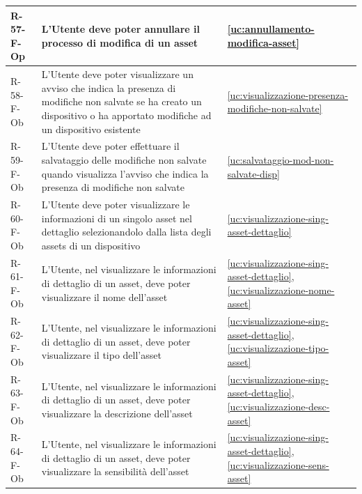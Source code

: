 ﻿\documentclass[a4paper,12pt]{article}
\begin{document}
{{\begin{longtable}{|l|p{}|p{}|}
            R-57-F-Op       & L'Utente deve poter annullare il processo di modifica di un asset                                                                                                                           & \ref{uc:annullamento-modifica-asset}                                               \\ \hline
            R-58-F-Ob       & L'Utente deve poter visualizzare un avviso che indica la presenza di modifiche non salvate se ha creato un dispositivo o ha apportato modifiche ad un dispositivo esistente                 & \ref{uc:visualizzazione-presenza-modifiche-non-salvate}                                               \\ \hline
            R-59-F-Ob       & L'Utente deve poter effettuare il salvataggio delle modifiche non salvate quando visualizza l'avviso che indica la presenza di modifiche non salvate                                        & \ref{uc:salvataggio-mod-non-salvate-disp}                                               \\ \hline
            R-60-F-Ob       & L'Utente deve poter visualizzare le informazioni di un singolo asset nel dettaglio selezionandolo dalla lista degli assets di un dispositivo                                                & \ref{uc:visualizzazione-sing-asset-dettaglio}                                              \\ \hline
            R-61-F-Ob       & L'Utente, nel visualizzare le informazioni di dettaglio di un asset, deve poter visualizzare il nome dell'asset                                                                             & \ref{uc:visualizzazione-sing-asset-dettaglio}, \ref{uc:visualizzazione-nome-asset}                 \\ \hline
            R-62-F-Ob       & L'Utente, nel visualizzare le informazioni di dettaglio di un asset, deve poter visualizzare il tipo dell'asset                                                                             & \ref{uc:visualizzazione-sing-asset-dettaglio}, \ref{uc:visualizzazione-tipo-asset}                 \\ \hline
            R-63-F-Ob       & L'Utente, nel visualizzare le informazioni di dettaglio di un asset, deve poter visualizzare la descrizione dell'asset                                                                      & \ref{uc:visualizzazione-sing-asset-dettaglio}, \ref{uc:visualizzazione-desc-asset}                 \\ \hline
            R-64-F-Ob       & L'Utente, nel visualizzare le informazioni di dettaglio di un asset, deve poter visualizzare la sensibilità dell'asset                                                                      & \ref{uc:visualizzazione-sing-asset-dettaglio}, \ref{uc:visualizzazione-sens-asset}                 \\ \hline

\end{longtable}}}
\end{document}

